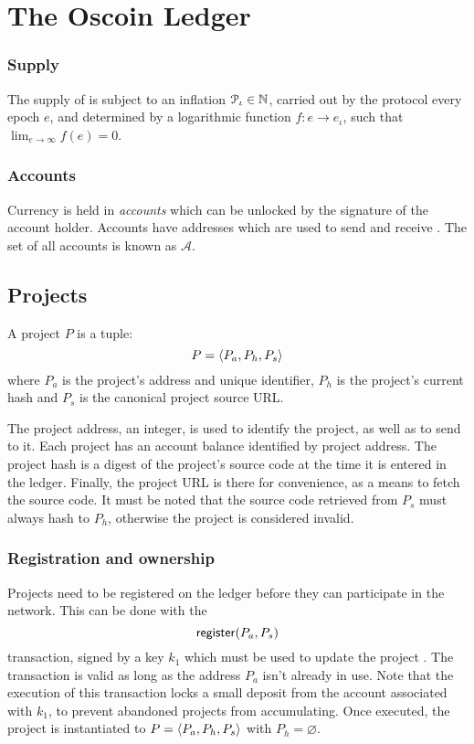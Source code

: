 \section{The Oscoin Ledger}
\label{s:ledger}

\subsubsection{Supply}

The supply of \oscoin{} is subject to an inflation $\mathcal{P}_{\iota} \in
\mathbb{N}$, carried out by the protocol every epoch $e$, and determined by a
logarithmic function $f : e \to e_{\iota}$, such that $\lim_{e \to \infty} f(e)
= 0$.

\subsubsection{Accounts}
\label{s:accounts}

Currency is held in \emph{accounts} which can be unlocked by the signature of
the account holder. Accounts have addresses which are used to send and receive
\oscoin{}. The set of all accounts is known as $\mathcal{A}$.

\subsection{Projects}
\label{s:projects}

A project $P$ is a tuple:
\[
    P = \langle P_a, P_h, P_s\rangle
\]
where $P_{a}$ is the project's address and unique identifier, $P_h$ is
the project's current hash and $P_s$ is the canonical project source
URL.

The project address, an integer, is used to identify the project, as
well as to send \oscoin{} to it. Each project has an account balance
identified by project address. The project hash is a digest of the
project's source code at the time it is entered in the
ledger. Finally, the project URL is there for convenience, as a means
to fetch the source code.  It must be noted that the source code
retrieved from $P_s$ must always hash to $P_h$, otherwise the project
is considered invalid.

\subsubsection{Registration and ownership} Projects need to be
registered on the ledger before they can participate in the
network. This can be done with the
\[
    \mathsf{register}\small{\lparen P_a, P_s\rparen}
\]
transaction, signed by a key $k_1$ which must be used to update the project . The
transaction is valid as long as the address $P_a$ isn't already in use. Note
that the execution of this transaction locks a small \oscoin{} deposit
from the account associated with $k_1$, to prevent abandoned projects from
accumulating. Once executed, the project is instantiated to
$P = \langle P_a, P_h, P_s\rangle$ with $P_h = \varnothing$.

